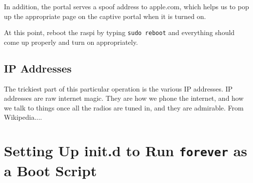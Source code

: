 In addition, the portal serves a spoof address to apple.com, which helps us to pop up the appropriate page on the captive portal when it is turned on. 

At this point, reboot the raspi by typing \texttt{sudo reboot} and everything should come up properly and turn on appropriately.

\subsection{IP Addresses}
The trickiest part of this particular operation is the various IP addresses. IP addresses are raw internet magic. They are how we phone the internet, and how we talk to things once all the radios are tuned in, and they are admirable. From Wikipedia....

\section{Setting Up init.d to Run \texttt{forever} as a Boot Script}